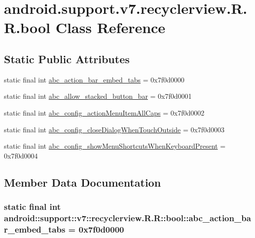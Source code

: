 \hypertarget{classandroid_1_1support_1_1v7_1_1recyclerview_1_1_r_1_1bool}{
\section{android.support.v7.recyclerview.R.R.bool Class Reference}
\label{classandroid_1_1support_1_1v7_1_1recyclerview_1_1_r_1_1bool}
}
\subsection*{Static Public Attributes}
\begin{CompactItemize}
\item 
static final int \hyperlink{classandroid_1_1support_1_1v7_1_1recyclerview_1_1_r_1_1bool_81bca458d78cb12b5526fa0345036bef}{abc\_\-action\_\-bar\_\-embed\_\-tabs} = 0x7f0d0000
\item 
static final int \hyperlink{classandroid_1_1support_1_1v7_1_1recyclerview_1_1_r_1_1bool_148194fd8cf37630c451840d71aaa574}{abc\_\-allow\_\-stacked\_\-button\_\-bar} = 0x7f0d0001
\item 
static final int \hyperlink{classandroid_1_1support_1_1v7_1_1recyclerview_1_1_r_1_1bool_8ec357423441a510ea7929c0a952e1da}{abc\_\-config\_\-actionMenuItemAllCaps} = 0x7f0d0002
\item 
static final int \hyperlink{classandroid_1_1support_1_1v7_1_1recyclerview_1_1_r_1_1bool_514d767380e83d2c724f34ead4bfe30e}{abc\_\-config\_\-closeDialogWhenTouchOutside} = 0x7f0d0003
\item 
static final int \hyperlink{classandroid_1_1support_1_1v7_1_1recyclerview_1_1_r_1_1bool_aa2736793259d34a41bf7ef929c154c3}{abc\_\-config\_\-showMenuShortcutsWhenKeyboardPresent} = 0x7f0d0004
\end{CompactItemize}


\subsection{Member Data Documentation}
\hypertarget{classandroid_1_1support_1_1v7_1_1recyclerview_1_1_r_1_1bool_81bca458d78cb12b5526fa0345036bef}{
\subsubsection[{abc\_\-action\_\-bar\_\-embed\_\-tabs}]{\setlength{\rightskip}{0pt plus 5cm}static final int android::support::v7::recyclerview.R.R::bool::abc\_\-action\_\-bar\_\-embed\_\-tabs = 0x7f0d0000}}
\label{classandroid_1_1support_1_1v7_1_1recyclerview_1_1_r_1_1bool_81bca458d78cb12b5526fa0345036bef}


